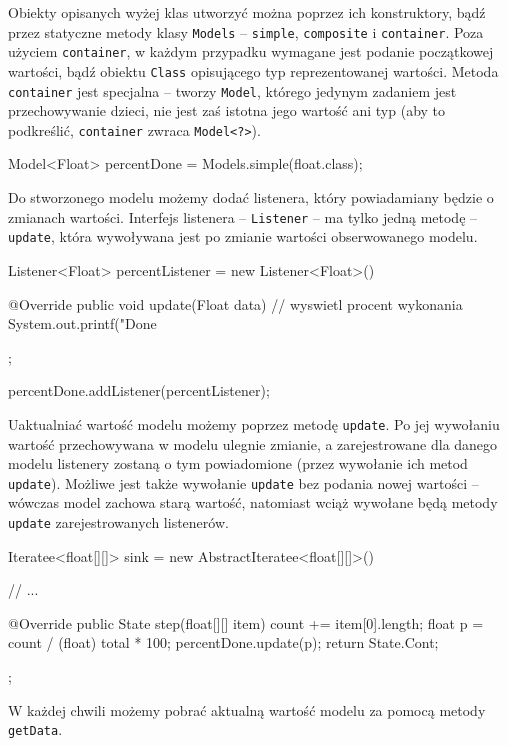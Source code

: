 Obiekty opisanych wyżej klas utworzyć można poprzez ich konstruktory, bądź przez statyczne metody
klasy \texttt{Models} -- \texttt{simple}, \texttt{composite} i \texttt{container}. Poza użyciem
\texttt{container}, w każdym przypadku wymagane jest podanie początkowej wartości, bądź obiektu
\texttt{Class} opisującego typ reprezentowanej wartości. Metoda \texttt{container} jest specjalna --
tworzy \texttt{Model}, którego jedynym zadaniem jest przechowywanie dzieci, nie jest zaś istotna
jego wartość ani typ (aby to podkreślić, \texttt{container} zwraca \texttt{Model<?>}).

\begin{java}
Model<Float> percentDone = Models.simple(float.class);
\end{java}

Do stworzonego modelu możemy dodać listenera, który powiadamiany będzie o zmianach wartości.
Interfejs listenera -- \texttt{Listener} -- ma tylko jedną metodę -- \texttt{update}, która
wywoływana jest po zmianie wartości obserwowanego modelu.

\begin{java}
Listener<Float> percentListener = new Listener<Float>() {

    @Override
    public void update(Float data) {
        // wyswietl procent wykonania
        System.out.printf("Done %
    }
};

percentDone.addListener(percentListener);
\end{java}

Uaktualniać wartość modelu możemy poprzez metodę \texttt{update}. Po jej wywołaniu wartość
przechowywana w modelu ulegnie zmianie, a zarejestrowane dla danego modelu listenery zostaną o tym
powiadomione (przez wywołanie ich metod \texttt{update}). Możliwe jest także wywołanie
\texttt{update} bez podania nowej wartości -- wówczas model zachowa starą wartość, natomiast wciąż
wywołane będą metody \texttt{update} zarejestrowanych listenerów.

\begin{java}
Iteratee<float[][]> sink = new AbstractIteratee<float[][]>() {

    // ...

    @Override
    public State step(float[][] item) {
        count += item[0].length;
        float p = count / (float) total * 100;
        percentDone.update(p);
        return State.Cont;
    }
};
\end{java}

W każdej chwili możemy pobrać aktualną wartość modelu za pomocą metody \texttt{getData}.

